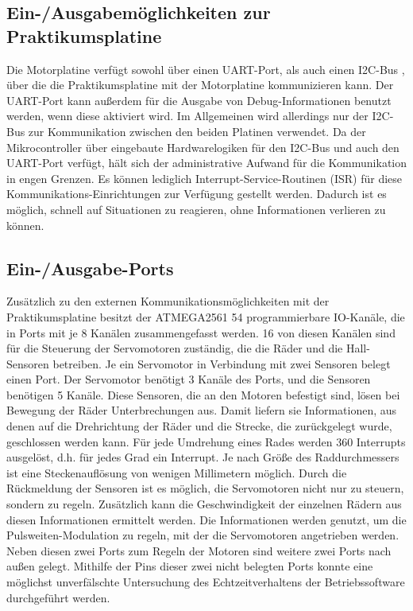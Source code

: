 \subsection{Ein-/Ausgabemöglichkeiten zur Praktikumsplatine}
Die Motorplatine verfügt sowohl über einen UART-Port, als auch einen I2C-Bus \cite{I2C_WIKI}, über die
die Praktikumsplatine mit der Motorplatine kommunizieren kann. Der UART-Port kann außerdem
für die Ausgabe von Debug-Informationen benutzt werden, wenn diese aktiviert wird. Im Allgemeinen
wird allerdings nur der I2C-Bus zur Kommunikation zwischen den beiden Platinen verwendet.
Da der Mikrocontroller über eingebaute Hardwarelogiken für den I2C-Bus und auch
den UART-Port verfügt, hält sich der administrative Aufwand für die Kommunikation in engen
Grenzen. Es können lediglich Interrupt-Service-Routinen (ISR) für diese Kommunikations-Einrichtungen zur Verfügung gestellt
werden. Dadurch ist es möglich, schnell auf Situationen zu reagieren, ohne Informationen verlieren zu können.
\subsection{Ein-/Ausgabe-Ports}
Zusätzlich zu den externen Kommunikationsmöglichkeiten mit der Praktikumsplatine besitzt der ATMEGA2561 54
programmierbare IO-Kanäle, die in Ports mit je 8 Kanälen zusammengefasst werden. 16 von diesen
Kanälen sind für die Steuerung der Servomotoren zuständig, die die Räder und die Hall-Sensoren betreiben.
Je ein Servomotor in Verbindung mit zwei Sensoren belegt einen Port. Der Servomotor benötigt 3 Kanäle
des Ports, und die Sensoren benötigen 5 Kanäle.
Diese Sensoren, die an den Motoren befestigt sind, lösen bei Bewegung der Räder Unterbrechungen aus.
Damit liefern sie Informationen, aus denen auf die Drehrichtung der Räder und die Strecke, die zurückgelegt wurde,
geschlossen werden kann.
Für jede Umdrehung eines Rades werden 360 Interrupts ausgelöst, d.h. für jedes Grad ein Interrupt. Je
nach Größe des Raddurchmessers ist eine Steckenauflösung von wenigen Millimetern möglich.
Durch die Rückmeldung der Sensoren ist es möglich, die Servomotoren nicht nur zu steuern, sondern zu regeln.
Zusätzlich kann die Geschwindigkeit der einzelnen Rädern aus diesen Informationen ermittelt werden.
Die Informationen werden genutzt, um die Pulsweiten-Modulation zu regeln, mit der die Servomotoren angetrieben
werden.\\
Neben diesen zwei Ports zum Regeln der Motoren sind weitere zwei Ports nach außen gelegt. Mithilfe
der Pins dieser zwei nicht belegten Ports konnte eine möglichst unverfälschte Untersuchung des
Echtzeitverhaltens der Betriebssoftware durchgeführt werden.

